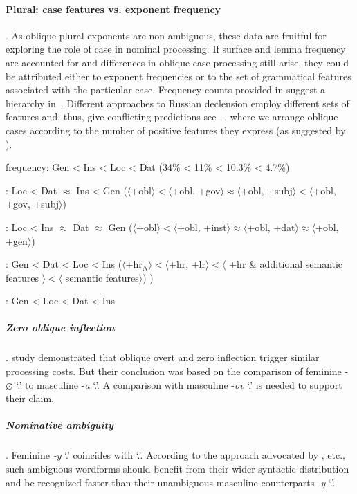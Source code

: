 \documentclass[output=paper, modfonts,newtxmath,hidelinks]{langscibook}
\begin{document}
\paragraph*{Plural: case features vs. exponent frequency}. As oblique plural exponents are non-ambiguous, these data are fruitful for exploring the role of case in nominal processing. If surface and lemma frequency are accounted for and differences in oblique case processing still arise, they could be attributed either to exponent frequencies or to the set of grammatical features associated with the particular case. Frequency counts provided in \citet{samojlova2014frequencies} suggest a hierarchy in~. Different approaches to Russian declension employ different sets of features and, thus, give conflicting predictions see --, where we arrange oblique cases according to the number of positive features they express (as suggested by \citealt{clahsen2001mental}).

\ea \ea \label{ex:freqpl} frequency: Gen < Ins < Loc < Dat (34\% < 11\% < 10.3\% < 4.7\%)
    
    \ex \label{ex:mueller}  \citealt{muller2004decomposing}: Loc < Dat $\approx$ Ins < Gen ($\langle$+obl$\rangle < \langle$+obl, +gov$\rangle \approx \langle$+obl, +subj$\rangle < \langle$+obl, +gov, +subj$\rangle$)
    
    \ex \label{ex:wiese}	\citealt{wiese2004categories}:  Loc < Ins $\approx$ Dat $\approx$ Gen ($\langle$+obl$\rangle < \langle$+obl, +inst$\rangle \approx \langle$+obl, +dat$\rangle \approx \langle$+obl, +gen$\rangle$)
    
    \ex \label{ex:wunderlich}	\citealt{wunderlich1996minimalist}: Gen < Dat < Loc < Ins ($\langle$+hr$_N \rangle < \langle$+hr, +lr$\rangle < \langle$ +hr \& additional semantic features $\rangle < \langle$ semantic features$\rangle$) 
)
    
    \ex \label{ex:caha} \citealt{caha2008case}: Gen < Loc < Dat < Ins
    \z
\z

\subparagraph*{{Zero oblique inflection}}.  study demonstrated that oblique overt and zero inflection trigger similar processing costs. But their conclusion was based on the comparison of feminine -$\varnothing$ `\genn.\pl' to masculine -\textit{a} `\genn.\sg'. A comparison with masculine -\textit{ov} `\genn.\pl' is needed to support their claim.

\subparagraph*{{Nominative ambiguity}}. Feminine \textit{-y} `\nomm.\pl' coincides with `\genn.\sg'. According to the approach advocated by \citet{kostic1991informational}, etc., such ambiguous wordforms should benefit from their wider syntactic distribution and be recognized faster than their unambiguous masculine counterparts -\textit{y} `\nomm.\pl'.
\end{document}
